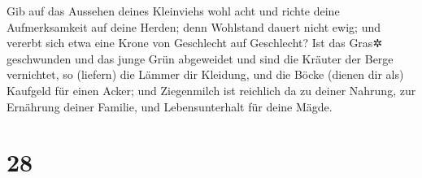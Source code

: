 Gib auf das Aussehen deines Kleinviehs wohl acht und
richte deine Aufmerksamkeit auf deine Herden; denn
Wohlstand dauert nicht ewig; und vererbt sich etwa eine Krone von
Geschlecht auf Geschlecht? Ist das Gras✲ geschwunden und
das junge Grün abgeweidet und sind die Kräuter der Berge vernichtet,
so (liefern) die Lämmer dir Kleidung, und die Böcke
(dienen dir als) Kaufgeld für einen Acker; und
Ziegenmilch ist reichlich da zu deiner Nahrung, zur Ernährung deiner
Familie, und Lebensunterhalt für deine Mägde.

\hypertarget{section-27}{%
\section{28}\label{section-27}}

